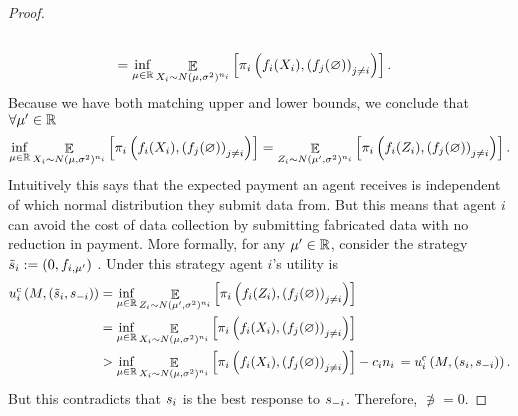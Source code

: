 \begin{proof}
\begin{align*}
{{            }
        }
        \\
        &=
        \inf_{\mu\in\mathbb{R}}
        \mathop{\mathbb{E}}_{
            X_{i}\sim N(\mu,\sigma^2)^{n_i}
        }
        \left[
            \pi_i\left(
                f_i(X_{i}), \left(f_j(\varnothing)\right)_{j\neq i}
            \right)
        \right] .
    \end{align*}
    Because we have both matching upper and lower bounds, we conclude that $\forall \mu'\in\mathbb{R}$
    \begin{align*}
        \inf_{\mu\in\mathbb{R}}
        \mathop{\mathbb{E}}_{
            X_{i}\sim N(\mu,\sigma^2)^{n_i}
        }
        \left[
            \pi_i\left(
                f_i(X_{i}), \left(f_j(\varnothing)\right)_{j\neq i}
            \right)
        \right]
        = 
        \mathop{\mathbb{E}}_{
            Z_i\sim N(\mu',\sigma^2)^{n_i}
        }
        \left[
            \pi_i\left(
                f_i(Z_i), \left(f_j(\varnothing)\right)_{j\neq i}
            \right)
        \right] .
    \end{align*}
    Intuitively this says that the expected payment an agent receives is independent of which normal distribution they submit data from. But this means that agent $i$ can avoid the cost of data collection by submitting fabricated data with no reduction in payment. More formally, for any $\mu'\in\mathbb{R}$, consider the strategy $\Tilde{s}_i:=
    (0,f_{i,\mu'})$ . 
    Under this strategy agent $i$'s utility is 
    \begin{align*}
        u^{\rm c}_{i}\left(M, \left(\Tilde{s}_i, s_{-i}\right)\right)
        &=
        \inf_{\mu\in\mathbb{R}}
        \mathop{\mathbb{E}}_{
            Z_i\sim N(\mu',\sigma^2)^{n_i}
        }
        \left[
            \pi_i\left(
                f_i(Z_i), \left(f_j(\varnothing)\right)_{j\neq i}
            \right)
        \right]
        \\
        &=
        \inf_{\mu\in\mathbb{R}}
        \mathop{\mathbb{E}}_{
            X_{i}\sim N(\mu,\sigma^2)^{n_i}
        }
        \left[
            \pi_i\left(
                f_i(X_{i}), \left(f_j(\varnothing)\right)_{j\neq i}
            \right)
        \right]
        \\
        &>
        \inf_{\mu\in\mathbb{R}}
        \mathop{\mathbb{E}}_{
            X_{i}\sim N(\mu,\sigma^2)^{n_i}
        }
        \left[
            \pi_i\left(
                f_i(X_{i}), \left(f_j(\varnothing)\right)_{j\neq i}
            \right)
        \right]
        -c_in_i
        \,=
        u^{\rm c}_{i}\left(M, \left(s_i, s_{-i}\right)\right) .
    \end{align*}
    But this contradicts that $s_i$ is the best response to $s_{-i}$. Therefore, $\nni=0$.
\end{proof}

